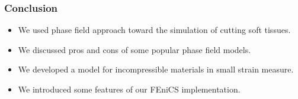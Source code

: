 \documentclass{beamer}
\begin{document}
%
%
%
%
%
%
%
%
%
%

\begin{frame}
	\frametitle{Conclusion}
	\begin{itemize}
		\setlength\itemsep{2em}
		\item We used phase field approach toward the simulation of cutting soft tissues.
		\item We discussed pros and cons of some popular phase field models.
		\item We developed a model for incompressible materials in small strain measure.
		\item We introduced some features of our FEniCS implementation.
	\end{itemize}
\end{frame}

\frame[allowframebreaks]{  
	\tiny  
	  
}
\end{document}
